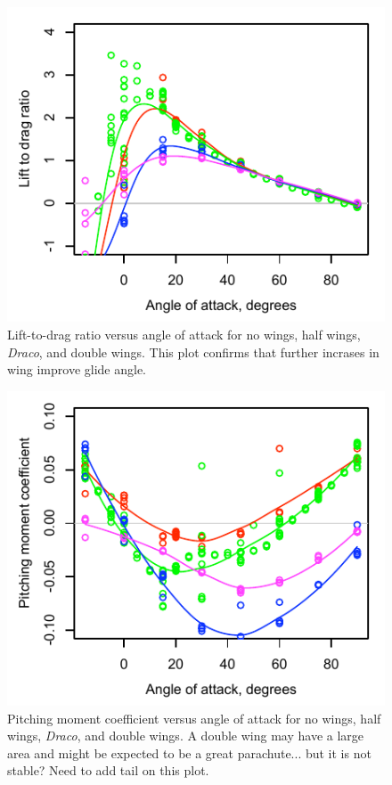 \documentclass[10pt]{article}
\newcommand{\Draco}{\emph{Draco}}
\begin{document}
\begin{figure}
\includegraphics{figures/LD_v_aoa_wings.pdf}
\caption{Lift-to-drag ratio versus angle of attack for no wings, half wings, \Draco, and double wings.  This plot confirms that further incrases in wing improve glide angle.}
\label{fig:LD_v_aoa_wings}
\end{figure}

\begin{figure}
\includegraphics{figures/Cm_v_aoa_wings.pdf}
\caption{Pitching moment coefficient versus angle of attack for no wings, half wings, \Draco, and double wings.  A double wing may have a large area and might be expected to be a great parachute... but it is not stable?  Need to add tail on this plot.}
\label{fig:Cm_v_aoa_wings}
\end{figure}
\end{document}
